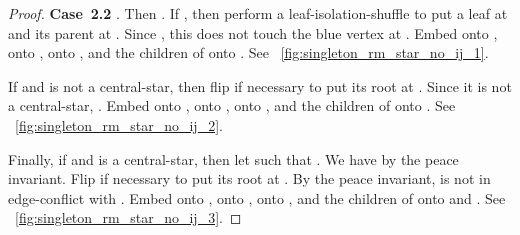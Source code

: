 \documentclass[11pt,a4paper,colorlinks=true,urlcolor=blue,citecolor=red]{article}
\theoremstyle{plain}
\newcommand{\case}[1]{\par\vspace{.5\baselineskip}\noindent\textbf{\sffamily Case~#1}}
\begin{document}
\begin{proof}
  \case{2.2} . Then . If
  , then perform a leaf-isolation-shuffle to put a
  leaf at  and its parent at . Since ,
  this does not touch the blue vertex at . Embed  onto , 
  onto ,  onto , and the children of  onto .
  See \figurename~\ref{fig:singleton_rm_star_no_ij_1}.

  If  and  is not a central-star, then
  flip  if necessary to put its root at . Since it is
  not a central-star, . Embed  onto , 
  onto ,  onto , and the children of  onto . See
  \figurename~\ref{fig:singleton_rm_star_no_ij_2}.

  Finally, if  and  is a central-star, then
  let  such that . We have  by the
  peace invariant. Flip  if necessary to put its root
  at . By the peace invariant,  is not in edge-conflict
  with . Embed  onto ,  onto ,  onto , and the
  children of  onto  and . See
  \figurename~\ref{fig:singleton_rm_star_no_ij_3}.
\end{proof}
\end{document}
